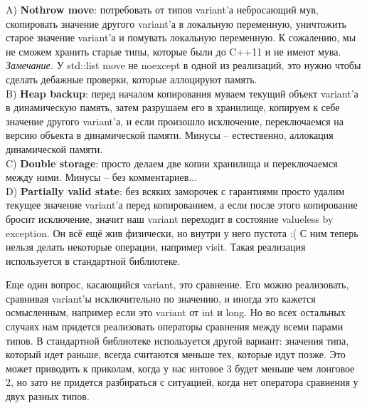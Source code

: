 \documentclass[12pt, a4paper]{article}
\begin{document}
A) \textbf{Nothrow move}: потребовать от типов variant'а небросающий мув, скопировать значение другого variant'а в локальную переменную, уничтожить старое значение variant'а и помувать локальную переменную. К сожалению, мы не сможем хранить старые типы, которые были до C++11 и не имеют мува. \\
\textit{Замечание.} У std::list move не noexcept в одной из реализаций, это нужно чтобы сделать дебажные проверки, которые аллоцируют память.\\
B) \textbf{Heap backup}: перед началом копирования муваем текущий объект variant'а в динамическую память, затем разрушаем его в хранилище, копируем к себе значение другого variant'а, и если произошло исключение, переключаемся на версию объекта в динамической памяти. Минусы -- естественно, аллокация динамической памяти.\\
C) \textbf{Double storage}: просто делаем две копии хранилища и переключаемся между ними. Минусы -- без комментариев...\\
D) \textbf{Partially valid state}: без всяких заморочек с гарантиями просто удалим текущее значение variant'а перед копированием, а если после этого копирование бросит исключение, значит наш variant переходит в состояние valueless by exception. Он всё ещё жив физически, но внутри у него пустота :( С ним теперь нельзя делать некоторые операции, например visit. Такая реализация используется в стандартной библиотеке. \\
\par Еще один вопрос, касающийся variant, это сравнение. Его можно реализовать, сравнивая variant'ы исключительно по значению, и иногда это кажется осмысленным, например если это variant от int и long. Но во всех остальных случаях нам придется реализовать операторы сравнения между всеми парами типов. В стандартной библиотеке используется другой вариант: значения типа, который идет раньше, всегда считаются меньше тех, которые идут позже. Это может приводить к приколам, когда у нас интовое 3 будет меньше чем лонговое 2, но зато не придется разбираться с ситуацией, когда нет оператора сравнения у двух разных типов.
\end{document}
